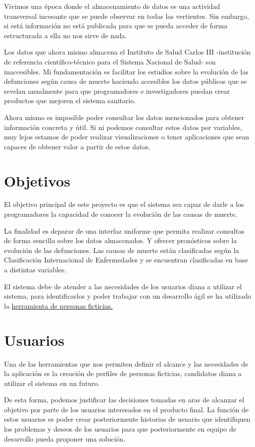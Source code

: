 Vivimos una época donde el almacenamiento de datos es una actividad transversal incesante
que se puede observar en todas las vertientes. Sin embargo, si está información no está
publicada para que se pueda acceder de forma estructurada a ella no nos sirve de nada. 

Los datos que ahora mismo almacena el Instituto de Salud Carlos III -institución de
referencia científico-técnico para el Sistema Nacional de Salud- son inaccesibles.  Mi
fundamentación es facilitar los estudios sobre la evolución de las defunciones según causa
de muerte haciendo accesibles los datos públicos que se revelan anualmente para que
programadores e investigadores puedan crear productos que mejoren el sistema sanitario.

Ahora mismo es imposible poder consultar los datos mencionados para obtener información
concreta y útil.  Si ni podemos consultar estos datos por variables, muy lejos estamos de
poder realizar visualizaciones o tener aplicaciones que sean capaces de obtener valor a
partir de estos datos.

\section{Objetivos}
\label{sec:obj}
El objetivo principal de este proyecto es que el sistema sea capaz de darle a los
programadores la capacidad de conocer la evolución de las causas de muerte. 

La finalidad es deparar de una interfaz uniforme que permita realizar consultas de forma
sencilla sobre los datos almacenados. Y ofrecer pronósticos sobre la evolución de las
defunciones. Las causas de muerte están clasificadas según la Clasificación Internacional
de Enfermedades y se encuentran clasificadas en base a distintas variables. 

El sistema debe de atender a las necesidades de los usuarios diana a utilizar el sistema, para
identificarlos y poder trabajar con un desarrollo ágil se ha utilizado la
\hyperref[sec:usu]{herramienta de personas ficticias.}

\section{Usuarios}
\label{sec:usu}
Una de las herramientas que nos permiten definir el alcance y las necesidades de la
aplicación es la creación de perfiles de personas ficticias, candidatos diana a utilizar
el sistema en un futuro.

De esta forma, podemos justificar las decisiones tomadas en aras de alcanzar el objetivo
por parte de los usuarios interesados en el producto final. La función de estos usuarios
es poder crear posteriormente historias de usuario que identifiquen los problemas y deseos
de los usuarios para que posteriormente en equipo de desarrollo pueda proponer una
solución.

